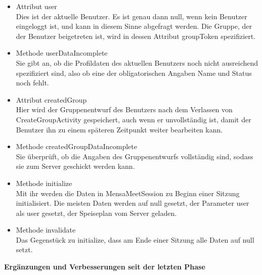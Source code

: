 \documentclass[a4paper]{scrreprt}
\begin{document}
\begin{itemize}
\item Attribut user \\
Dies ist der aktuelle Benutzer. Es ist genau dann null, wenn kein Benutzer eingeloggt ist, und kann in diesem Sinne abgefragt werden. Die Gruppe, der der Benutzer beigetreten ist, wird in dessen Attribut groupToken spezifiziert.
\item Methode userDataIncomplete \\
Sie gibt an, ob die Profildaten des aktuellen Benutzers noch nicht ausreichend spezifiziert sind, also ob eine der obligatorischen Angaben Name und Status noch fehlt.
\item Attribut createdGroup \\
Hier wird der Gruppenentwurf des Benutzers nach dem Verlassen von CreateGroupActivity gespeichert, auch wenn er unvollständig ist, damit der Benutzer ihn zu einem späteren Zeitpunkt weiter bearbeiten kann.
\item Methode createdGroupDataIncomplete \\
Sie überprüft, ob die Angaben des Gruppenentwurfs vollständig sind, sodass sie zum Server geschickt werden kann.
\item Methode initialize \\
Mit ihr werden die Daten in MensaMeetSession zu Beginn einer Sitzung initialisiert. Die meisten Daten werden auf null gesetzt, der Parameter user als user gesetzt, der Speiseplan vom Server geladen.
\item Methode invalidate \\
Das Gegenstück zu initialize, dass am Ende einer Sitzung alle Daten auf null setzt.
\end{itemize}

\textbf{Ergänzungen und Verbesserungen seit der letzten Phase}
\end{document}
